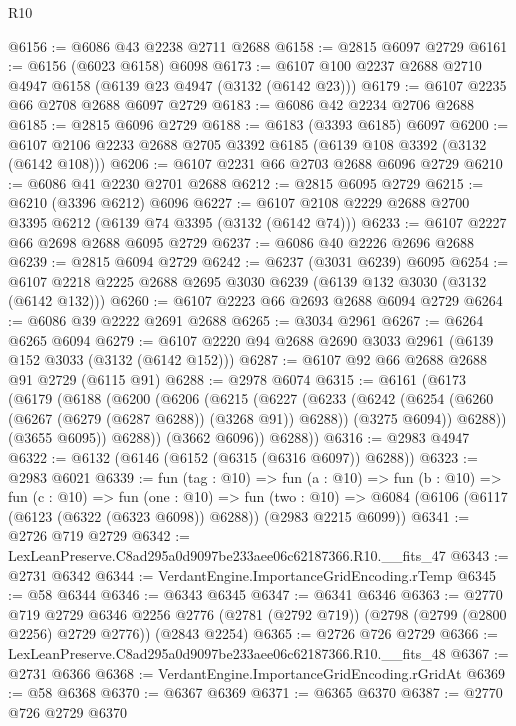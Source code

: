 \begin{lexlean}{R10}
\begin{coremodule}
@6156 := @6086 @43 @2238 @2711 @2688
@6158 := @2815 @6097 @2729
@6161 := @6156 (@6023 @6158) @6098
@6173 := @6107 @100 @2237 @2688 @2710 @4947 @6158 (@6139 @23 @4947 (@3132 (@6142 @23)))
@6179 := @6107 @2235 @66 @2708 @2688 @6097 @2729
@6183 := @6086 @42 @2234 @2706 @2688
@6185 := @2815 @6096 @2729
@6188 := @6183 (@3393 @6185) @6097
@6200 := @6107 @2106 @2233 @2688 @2705 @3392 @6185 (@6139 @108 @3392 (@3132 (@6142 @108)))
@6206 := @6107 @2231 @66 @2703 @2688 @6096 @2729
@6210 := @6086 @41 @2230 @2701 @2688
@6212 := @2815 @6095 @2729
@6215 := @6210 (@3396 @6212) @6096
@6227 := @6107 @2108 @2229 @2688 @2700 @3395 @6212 (@6139 @74 @3395 (@3132 (@6142 @74)))
@6233 := @6107 @2227 @66 @2698 @2688 @6095 @2729
@6237 := @6086 @40 @2226 @2696 @2688
@6239 := @2815 @6094 @2729
@6242 := @6237 (@3031 @6239) @6095
@6254 := @6107 @2218 @2225 @2688 @2695 @3030 @6239 (@6139 @132 @3030 (@3132 (@6142 @132)))
@6260 := @6107 @2223 @66 @2693 @2688 @6094 @2729
@6264 := @6086 @39 @2222 @2691 @2688
@6265 := @3034 @2961
@6267 := @6264 @6265 @6094
@6279 := @6107 @2220 @94 @2688 @2690 @3033 @2961 (@6139 @152 @3033 (@3132 (@6142 @152)))
@6287 := @6107 @92 @66 @2688 @2688 @91 @2729 (@6115 @91)
@6288 := @2978 @6074
@6315 := @6161
    (@6173
      (@6179
        (@6188
          (@6200
            (@6206
              (@6215
                (@6227
                  (@6233
                    (@6242
                      (@6254 (@6260 (@6267 (@6279 (@6287 @6288)) (@3268 @91)) @6288))
                      (@3275 @6094))
                    @6288))
                (@3655 @6095))
              @6288))
          (@3662 @6096))
        @6288))
@6316 := @2983 @4947
@6322 := @6132 (@6146 (@6152 (@6315 (@6316 @6097)) @6288))
@6323 := @2983 @6021
@6339 := fun (tag : @10) =>
  fun (a : @10) =>
  fun (b : @10) =>
  fun (c : @10) =>
  fun (one : @10) =>
  fun (two : @10) => @6084 (@6106 (@6117 (@6123 (@6322 (@6323 @6098)) @6288)) (@2983 @2215 @6099))
@6341 := @2726 @719 @2729
@6342 := LexLeanPreserve.C8ad295a0d9097be233aee06c62187366.R10.__fits_47
@6343 := @2731 @6342
@6344 := VerdantEngine.ImportanceGridEncoding.rTemp
@6345 := @58 @6344
@6346 := @6343 @6345
@6347 := @6341 @6346
@6363 := @2770
    @719
    @2729
    @6346
    @2256
    @2776
    (@2781 (@2792 @719))
    (@2798 (@2799 (@2800 @2256) @2729 @2776))
    (@2843 @2254)
@6365 := @2726 @726 @2729
@6366 := LexLeanPreserve.C8ad295a0d9097be233aee06c62187366.R10.__fits_48
@6367 := @2731 @6366
@6368 := VerdantEngine.ImportanceGridEncoding.rGridAt
@6369 := @58 @6368
@6370 := @6367 @6369
@6371 := @6365 @6370
@6387 := @2770
    @726
    @2729
    @6370

\end{coremodule}
\end{lexlean}
